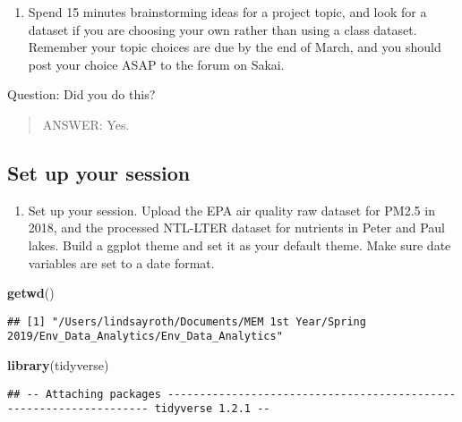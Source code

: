 \documentclass[]{article}
\newenvironment{Shaded}{\begin{snugshade}}{\end{snugshade}}
\newcommand{\KeywordTok}[1]{\textcolor[rgb]{0.13,0.29,0.53}{\textbf{#1}}}
\newcommand{\NormalTok}[1]{#1}
\providecommand{\tightlist}{%
  \setlength{\itemsep}{0pt}\setlength{\parskip}{0pt}}
\begin{document}
\begin{enumerate}
\def\labelenumi{\arabic{enumi}.}
\tightlist
\item
  Spend 15 minutes brainstorming ideas for a project topic, and look for
  a dataset if you are choosing your own rather than using a class
  dataset. Remember your topic choices are due by the end of March, and
  you should post your choice ASAP to the forum on Sakai.
\end{enumerate}

Question: Did you do this?

\begin{quote}
ANSWER: Yes.
\end{quote}

\subsection{Set up your session}\label{set-up-your-session}

\begin{enumerate}
\def\labelenumi{\arabic{enumi}.}
\setcounter{enumi}{1}
\tightlist
\item
  Set up your session. Upload the EPA air quality raw dataset for PM2.5
  in 2018, and the processed NTL-LTER dataset for nutrients in Peter and
  Paul lakes. Build a ggplot theme and set it as your default theme.
  Make sure date variables are set to a date format.
\end{enumerate}

\begin{Shaded}
\begin{Highlighting}[]
\KeywordTok{getwd}\NormalTok{()}
\end{Highlighting}
\end{Shaded}

\begin{verbatim}
## [1] "/Users/lindsayroth/Documents/MEM 1st Year/Spring 2019/Env_Data_Analytics/Env_Data_Analytics"
\end{verbatim}

\begin{Shaded}
\begin{Highlighting}[]
\KeywordTok{library}\NormalTok{(tidyverse)}
\end{Highlighting}
\end{Shaded}

\begin{verbatim}
## -- Attaching packages ------------------------------------------------------------------- tidyverse 1.2.1 --
\end{verbatim}
\end{document}
